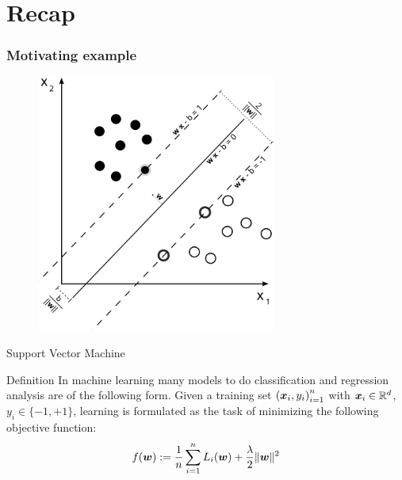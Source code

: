 \section{Recap}
\begin{frame}[fragile]
    \frametitle{Motivating example}
    \begin{figure}[htbp]
        \centering
        \includegraphics[height=0.8\textheight, width=0.7\textwidth]{images/svm_ex.png}
\end{figure}
\end{frame}

\begin{frame}{Support Vector Machine}
    \begin{block}{Definition}
        In machine learning many models to do classification and regression analysis are of the following form. Given a training set ${(\bm{x}_i, y_i)}_{i=1}^n$ with $\bm{x}_i\in \mathbb{R}^d$, $y_i\in\{-1,+1\}$, learning is formulated as the task of minimizing the following objective function:
        \[
            \label{eq:primalObjective}
            f(\bm{w}):= \frac1n \sum_{i=1}^n L_i(\bm{w})+\frac {\lambda} {2} \|\bm{w}\|^2
        \]
    \end{block}
\end{frame}

